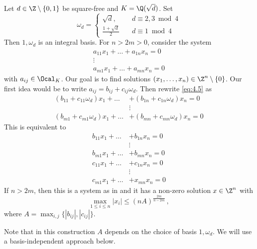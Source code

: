 \begin{exmp*}
	Let \( d \in \Z \setminus \{0,1\} \) be square-free and \( K = \Q(\sqrt{d}) \).
	Set
	\[ \omega_d = \begin{cases}
		\sqrt{d}, &d \equiv 2,3 \bmod 4\\
		\frac{1 + \sqrt{d}}{2} \quad &d \equiv 1 \bmod 4
	\end{cases} \]
	Then \( 1, \omega_d \) is an integral basis.
	For \( n > 2m > 0 \), consider the system
	\begin{equation}\label{eq:4.5}
		\begin{array}{c}
			a_{11} x_1 + \dots + a_{1n} x_n = 0\\
			\vdots \\
			a_{m1} x_1 + \dots + a_{mn} x_n = 0
		\end{array}
	\end{equation}
	with \( a_{ij} \in \Ocal_K \).
	Our goal is to find solutions \( (x_1, \dotsc, x_n) \in \Z^n \setminus \{0\} \).
	Our first idea would be to write \( a_{ij} = b_{ij} + c_{ij} \omega_d \).
	Then rewrite \eqref{eq:4.5} as
	\begin{align*}
		(b_{11} + c_{11}\omega_d) x_1 + \dots &+ (b_{1n} + c_{1n}\omega_d) x_n = 0\\
		&\vdots \\
		(b_{m1} + c_{m1}\omega_d) x_1 + \dots &+ (b_{mn} + c_{mn}\omega_d) x_n = 0
	\end{align*}
	This is equivalent to
	\begin{align*}
		b_{11}x_1 + \dots &+ b_{1n}x_n = 0\\
		&\vdots\\
		b_{m1}x_1 + \dots &+ b_{mn}x_n = 0\\
		c_{11}x_1 + \dots &+ c_{1n}x_n = 0\\
		&\vdots\\
		c_{m1}x_1 + \dots &+ x_{mn}x_n = 0
	\end{align*}
	If \( n > 2m \), then this is a system as in  and it has a non-zero solution \( x \in \Z^n \) with
	\[ \max_{1 \leq i \leq n} |x_i| \leq (nA)^\frac{2m}{n-2m} \,, \]
	where \( A = \max_{i,j} \big\{ |b_{ij}|, |c_{ij}| \big\} \).
\end{exmp*}

\begin{rem*}
	Note that in this construction \( A \) depends on the choice of basis \( 1, \omega_d \).
	We will use a basis-independent approach below.
\end{rem*}

